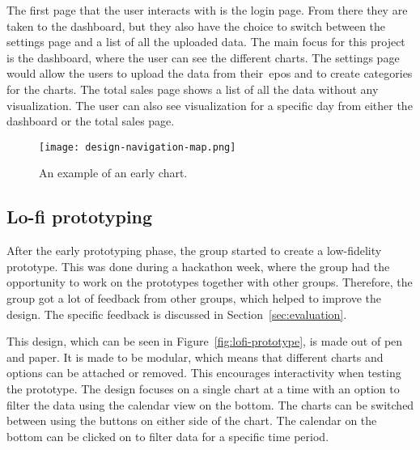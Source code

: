 The first page that the user interacts with is the login page.
From there they are taken to the dashboard, but they also have the choice to switch between the settings page and a list
of all the uploaded data.
The main focus for this project is the dashboard, where the user can see the different charts.
The settings page would allow the users to upload the data from their~\acrshort{epos} and to create categories for the
charts.
The total sales page shows a list of all the data without any visualization.
The user can also see visualization for a specific day from either the dashboard or the total sales page.

\begin{figure}[H]
    \centering
    \texttt{[image: design-navigation-map.png]}
    \caption{An example of an early chart.}\label{fig:navigation-map}
\end{figure}

\subsection{Lo-fi prototyping}\label{subsec:lo-fi-prototyping}

After the early prototyping phase, the group started to create a low-fidelity prototype.
This was done during a hackathon week, where the group had the opportunity to work on the prototypes together with
other groups.
Therefore, the group got a lot of feedback from other groups, which helped to improve the design.
The specific feedback is discussed in Section~\ref{sec:evaluation}.

This design, which can be seen in Figure~\ref{fig:lofi-prototype}, is made out of pen and paper.
It is made to be modular, which means that different charts and options can be attached or removed.
This encourages interactivity when testing the prototype.
The design focuses on a single chart at a time with an option to filter
the data using the calendar view on the bottom.
The charts can be switched between using the buttons on either side of the chart.
The calendar on the bottom can be clicked on to filter data for a specific time period.

